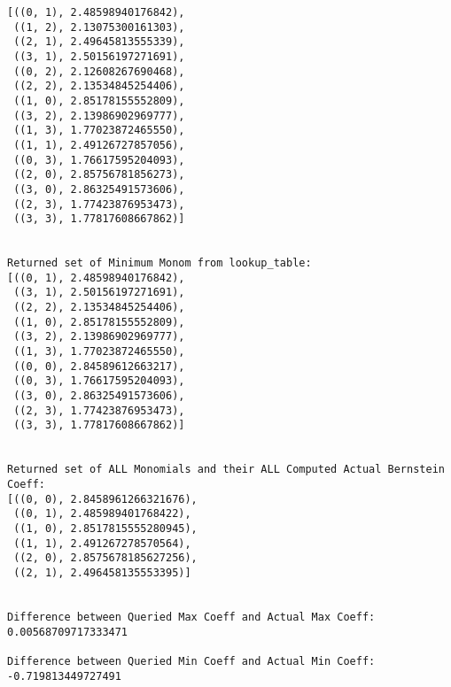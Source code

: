\begin{verbatim}
[((0, 1), 2.48598940176842),
 ((1, 2), 2.13075300161303),
 ((2, 1), 2.49645813555339),
 ((3, 1), 2.50156197271691),
 ((0, 2), 2.12608267690468),
 ((2, 2), 2.13534845254406),
 ((1, 0), 2.85178155552809),
 ((3, 2), 2.13986902969777),
 ((1, 3), 1.77023872465550),
 ((1, 1), 2.49126727857056),
 ((0, 3), 1.76617595204093),
 ((2, 0), 2.85756781856273),
 ((3, 0), 2.86325491573606),
 ((2, 3), 1.77423876953473),
 ((3, 3), 1.77817608667862)]


Returned set of Minimum Monom from lookup_table:
[((0, 1), 2.48598940176842),
 ((3, 1), 2.50156197271691),
 ((2, 2), 2.13534845254406),
 ((1, 0), 2.85178155552809),
 ((3, 2), 2.13986902969777),
 ((1, 3), 1.77023872465550),
 ((0, 0), 2.84589612663217),
 ((0, 3), 1.76617595204093),
 ((3, 0), 2.86325491573606),
 ((2, 3), 1.77423876953473),
 ((3, 3), 1.77817608667862)]


Returned set of ALL Monomials and their ALL Computed Actual Bernstein Coeff:
[((0, 0), 2.8458961266321676),
 ((0, 1), 2.485989401768422),
 ((1, 0), 2.8517815555280945),
 ((1, 1), 2.491267278570564),
 ((2, 0), 2.8575678185627256),
 ((2, 1), 2.496458135553395)]


Difference between Queried Max Coeff and Actual Max Coeff: 0.00568709717333471

Difference between Queried Min Coeff and Actual Min Coeff: -0.719813449727491
\end{verbatim}
